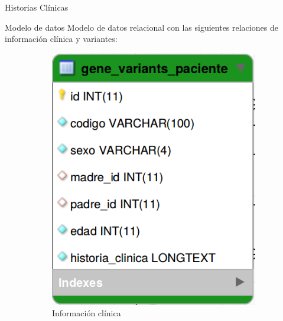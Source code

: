 \documentclass[xcolor=dvipsnames]{beamer}
\begin{document}
\begin{frame}{Historias Clínicas}


\end{frame}

\begin{frame}{Modelo de datos}
Modelo de datos relacional con las siguientes relaciones de información clínica y variantes:
      \begin{figure}
		\centering
		\begin{subfigure}[b]{0.2\textwidth}
			\includegraphics[width=\textwidth]{tabla1.png}
			\caption{Información clínica}
		\end{subfigure}
		\quad
		~ %
		\begin{subfigure}[b]{0.2\textwidth}

\end{subfigure}
\end{figure}
\end{frame}
\end{document}
